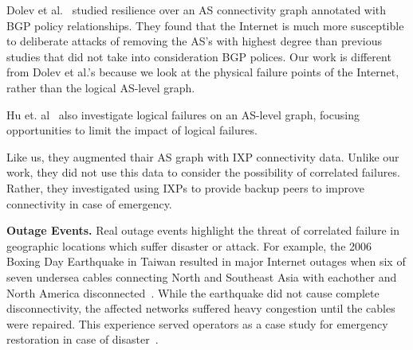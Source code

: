 
    Dolev et al.~\cite{resilience-under-BGP} studied resilience over an AS
    connectivity graph annotated with BGP policy relationships. They found that
    the Internet is much more susceptible to deliberate attacks of removing the
    AS's with highest degree than previous studies that did not take into
    consideration BGP polices. Our work is different from Dolev et al.'s because
    we look at the physical failure points of the Internet, rather than the
    logical AS-level graph.   
    
    Hu et. al~\cite{ixp-routingdiversity} also investigate logical failures on
    an AS-level graph, focusing opportunities to limit the impact of logical
    failures.

    Like us, they augmented thair AS graph with IXP connectivity data.  Unlike
    our work, they did not use this data to consider the possibility of
    correlated failures.  Rather, they investigated using IXPs to provide
    backup peers to improve connectivity in case of emergency.

{\bf Outage Events.}  Real outage events highlight the threat of correlated
    failure in geographic locations which suffer disaster or attack.  For
    example, the 2006 Boxing Day Earthquake in Taiwan resulted in major Internet
    outages when six of seven undersea cables connecting North and Southeast
    Asia with eachother and North America disconnected~\cite{asia-comm-quake}.
    While the earthquake did not cause complete disconnectivity, the affected
    networks suffered heavy congestion until the cables were repaired.  This
    experience served operators as a case study for emergency restoration in
    case of disaster~\cite{taiwan}.  
       
